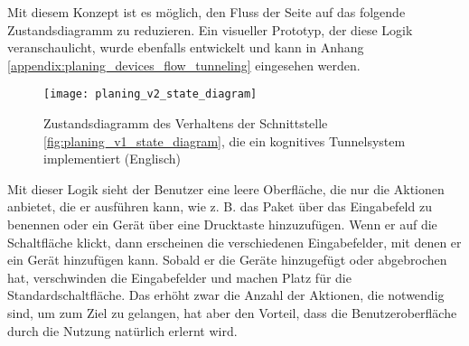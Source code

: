 Mit diesem Konzept ist es möglich, den Fluss der Seite auf das folgende Zustandsdiagramm zu reduzieren.
Ein visueller Prototyp, der diese Logik veranschaulicht, wurde ebenfalls entwickelt und kann in Anhang \ref{appendix:planing_devices_flow_tunneling} eingesehen werden.

\begin{figure}[H]
  \centering
  \texttt{[image: planing\_v2\_state\_diagram]}
  \caption{Zustandsdiagramm des Verhaltens der Schnittstelle \ref{fig:planing_v1_state_diagram}, die ein kognitives Tunnelsystem implementiert (Englisch)}
  \label{fig:planing_v2_state_diagram}
\end{figure}

Mit dieser Logik sieht der Benutzer eine leere Oberfläche, die nur die Aktionen anbietet, die er ausführen kann, wie z. B. das Paket über das Eingabefeld zu benennen oder ein Gerät über eine Drucktaste hinzuzufügen.
Wenn er auf die Schaltfläche klickt, dann erscheinen die verschiedenen Eingabefelder, mit denen er ein Gerät hinzufügen kann.
Sobald er die Geräte hinzugefügt oder abgebrochen hat, verschwinden die Eingabefelder und machen Platz für die Standardschaltfläche.
Das erhöht zwar die Anzahl der Aktionen, die notwendig sind, um zum Ziel zu gelangen, hat aber den Vorteil, dass die Benutzeroberfläche durch die Nutzung natürlich erlernt wird.
